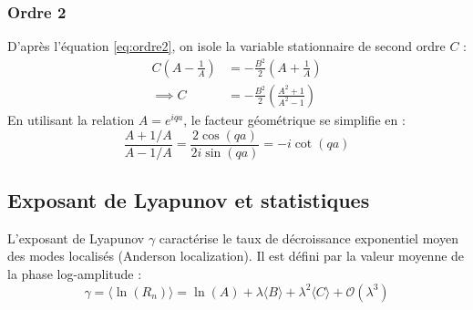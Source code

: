 \subsubsection{Ordre 2}
D'après l'équation \eqref{eq:ordre2}, on isole la variable stationnaire de second ordre $C$ :
\begin{align*}
    C \left( A - \frac{1}{A} \right) &= -\frac{B^2}{2}\left(A + \frac{1}{A}\right) \nonumber \\
    \implies C &= -\frac{B^2}{2} \left( \frac{A^2 + 1}{A^2 - 1} \right)
\end{align*}
En utilisant la relation $A = e^{iqa}$, le facteur géométrique se simplifie en :
\begin{equation*}
    \frac{A + 1/A}{A - 1/A} = \frac{2\cos(qa)}{2i\sin(qa)} = -i\cot(qa)
\end{equation*}

\subsection{Exposant de Lyapunov et statistiques}

L'exposant de Lyapunov $\gamma$ caractérise le taux de décroissance exponentiel moyen des modes localisés (Anderson localization). Il est défini par la valeur moyenne de la phase log-amplitude :
\begin{equation*}
    \gamma = \langle \ln(R_n) \rangle = \ln(A) + \lambda \langle B \rangle + \lambda^2 \langle C \rangle + \mathcal{O}(\lambda^3)
\end{equation*}


